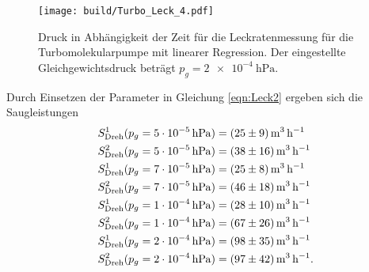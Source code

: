 \noindent
\begin{figure}[H]
    \centering
    \texttt{[image: build/Turbo\_Leck\_4.pdf]}
    \caption{Druck in Abhängigkeit der Zeit für die Leckratenmessung für die Turbomolekularpumpe mit linearer Regression. Der eingestellte Gleichgewichtsdruck beträgt $p_g=\SI{2e-4}{\hecto\pascal}$.}
    \label{fig:turbo_leck4}
\end{figure}
\noindent
Durch Einsetzen der Parameter in Gleichung \ref{eqn:Leck2} ergeben sich die Saugleistungen 
\begin{align*}
  S^1_\text{Dreh}(p_g=\SI{5e-5}{\hecto\pascal})&=\SI[per-mode=reciprocal]{25 \pm 9}{\cubic\metre\per\hour}\\
  S^2_\text{Dreh}(p_g=\SI{5e-5}{\hecto\pascal})&=\SI[per-mode=reciprocal]{38 \pm 16}{\cubic\metre\per\hour}\\
  S^1_\text{Dreh}(p_g=\SI{7e-5}{\hecto\pascal})&=\SI[per-mode=reciprocal]{25 \pm 8}{\cubic\metre\per\hour}\\
  S^2_\text{Dreh}(p_g=\SI{7e-5}{\hecto\pascal})&=\SI[per-mode=reciprocal]{46 \pm 18}{\cubic\metre\per\hour}\\
  S^1_\text{Dreh}(p_g=\SI{1e-4}{\hecto\pascal})&=\SI[per-mode=reciprocal]{28 \pm 10}{\cubic\metre\per\hour}\\
  S^2_\text{Dreh}(p_g=\SI{1e-4}{\hecto\pascal})&=\SI[per-mode=reciprocal]{67 \pm 26}{\cubic\metre\per\hour}\\
  S^1_\text{Dreh}(p_g=\SI{2e-4}{\hecto\pascal})&=\SI[per-mode=reciprocal]{98 \pm 35}{\cubic\metre\per\hour}\\
  S^2_\text{Dreh}(p_g=\SI{2e-4}{\hecto\pascal})&=\SI[per-mode=reciprocal]{97 \pm 42}{\cubic\metre\per\hour}.
\end{align*}